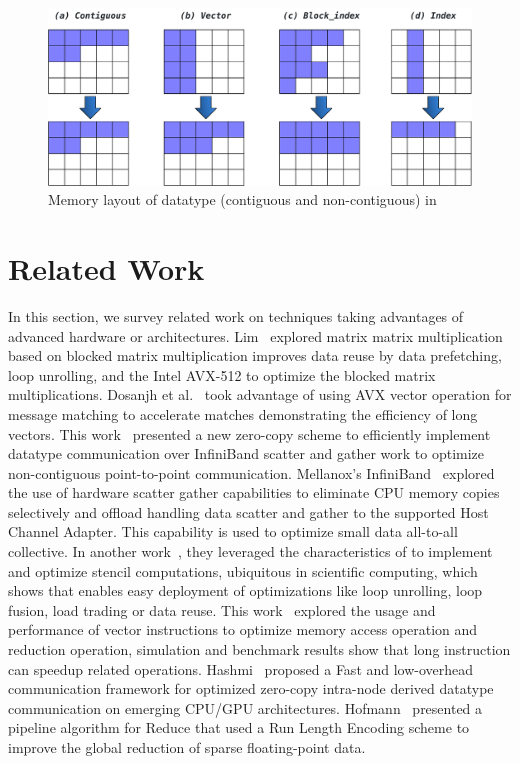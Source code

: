 \documentclass[conference]{IEEEtran}
\begin{document}
\begin{figure}[ht]
  \centering
  \includegraphics[width=0.8\linewidth]{ddt_ompi.pdf}
  \caption{Memory layout of datatype (contiguous and non-contiguous) in~\mpi}
  \label{fig:ddt_ompi}
\end{figure}

\section{Related Work}\label{sec:related}
In this section, we survey related work on techniques taking advantages of
advanced hardware or architectures.
%
Lim~\cite{Lim2018} explored matrix matrix multiplication based on blocked matrix multiplication
improves data reuse by data prefetching, loop unrolling, and the Intel AVX-512 to optimize
the blocked matrix multiplications.
%
Dosanjh et al.~\cite{tag-match} took advantage of using AVX vector operation for
\mpi message matching to accelerate matches demonstrating the efficiency
of long vectors.
%
This work~\cite{Berlin04} presented a new
zero-copy scheme to efficiently implement datatype communication over InfiniBand
scatter and gather work to optimize non-contiguous point-to-point communication.
%
Mellanox's InfiniBand~\cite{Gainaru2016} explored the use of hardware scatter
gather capabilities to eliminate CPU memory copies selectively and offload handling
data scatter and gather to the supported Host Channel Adapter. This capability is
used to optimize small data all-to-all collective.
%
In another work~\cite{sve-stencil}, they leveraged the characteristics of \sve to implement and optimize
stencil computations, ubiquitous in scientific computing, which shows
that \sve enables easy deployment of optimizations like loop unrolling,
loop fusion, load trading or data reuse.
%
This work~\cite{dongsve} explored the usage and performance of \sve vector instructions to optimize
memory access operation and reduction operation, simulation and benchmark results show that \sve long instruction can speedup related operations.
%
Hashmi~\cite{ASHMI20201} proposed a Fast and low-overhead communication framework
for optimized zero-copy intra-node derived datatype communication on emerging CPU/GPU architectures.
%
Hofmann~\cite{sparse-reduction} presented a pipeline algorithm for \mpi Reduce
that used a Run Length Encoding scheme to improve the global reduction of sparse
floating-point data.
\end{document}
